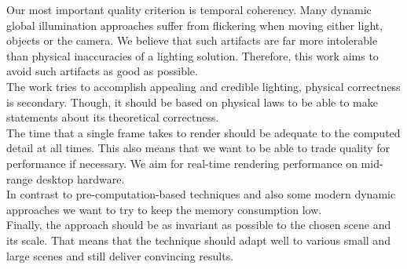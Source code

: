 \documentclass[thesis.tex]{subfiles}
\begin{document}
Our most important quality criterion is temporal coherency.
Many dynamic global illumination approaches suffer from flickering when moving either light, objects or the camera.
We believe that such artifacts are far more intolerable than physical inaccuracies of a lighting solution.
Therefore, this work aims to avoid such artifacts as good as possible.
\\
The work tries to accomplish appealing and credible lighting, physical correctness is secondary.
Though, it should be based on physical laws to be able to make statements about its theoretical correctness.
\\
The time that a single frame takes to render should be adequate to the computed detail at all times.
This also means that we want to be able to trade quality for performance if necessary.
We aim for real-time rendering performance on mid-range desktop hardware.
\\
In contrast to pre-computation-based techniques and also some modern dynamic approaches we want to try to keep the memory consumption low.
\\
Finally, the approach should be as invariant as possible to the chosen scene and its scale. %
That means that the technique should adapt well to various small and large scenes and still deliver convincing results.




\end{document}
